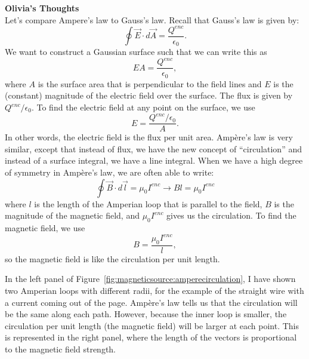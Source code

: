 \begin{framed}
\textbf{Olivia's Thoughts}\\
Let's compare Ampere's law to Gauss's law. Recall that Gauss's law is given by:
\begin{equation}
\oint \vec{E}\cdot d\vec{A}=\frac{Q^{enc}}{\epsilon_0}.
\end{equation}
We want to construct a Gaussian surface such that we can write this as
\begin{equation}
EA=\frac{Q^{enc}}{\epsilon_0},
\end{equation}
where $A$ is the surface area that is perpendicular to the field lines and $E$ is the (constant) magnitude of the electric field over the surface. The flux is given by $Q^{enc}/\epsilon_0$. To find the electric field at any point on the surface, we use
\begin{equation}
E=\frac{Q^{enc}/\epsilon_0}{A}.
\end{equation}
In other words, the electric field is the flux per unit area. Ampère's law is very similar, except that instead of flux, we have the new concept of ``circulation'' and instead of a surface integral, we have a line integral. When we have a high degree of symmetry in Ampère's law, we are often able to write:
\begin{equation}
\oint \vec{B}\cdot d\vec{l}=\mu_0 I^{enc}\rightarrow Bl=\mu_0 I^{enc}
\end{equation}
where $l$ is the length of the Amperian loop that is parallel to the field, $B$ is the magnitude of the magnetic field, and $\mu_0 I^{enc}$ gives us the circulation. To find the magnetic field, we use
\begin{equation}
B=\frac{\mu_0 I^{enc}}{l},
\end{equation}
so the magnetic field is like the circulation per unit length.

In the left panel of Figure~\ref{fig:magneticsource:amperecirculation}, I have shown two Amperian loops with different radii, for the example of the straight wire with a current coming out of the page. Ampère's law tells us that the circulation will be the same along each path. However, because the inner loop is smaller, the circulation per unit length (the magnetic field) will be larger at each point. This is represented in the right panel, where the length of the vectors is proportional to the magnetic field strength.


\end{framed}
